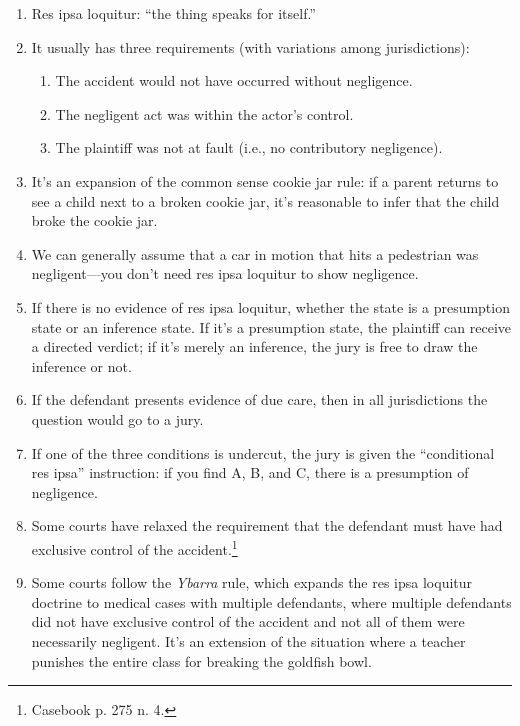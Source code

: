 \begin{enumerate}
    \item Res ipsa loquitur: ``the thing speaks for itself.''
    \item It usually has three requirements (with variations among 
    jurisdictions):
    \begin{enumerate}
        \item The accident would not have occurred without negligence.
        \item The negligent act was within the actor's control.
        \item The plaintiff was not at fault (i.e., no contributory 
        negligence).
    \end{enumerate}
    \item It's an expansion of the common sense cookie jar rule: if a parent 
    returns to see a child next to a broken cookie jar, it's reasonable to 
    infer that the child broke the cookie jar.
    \item We can generally assume that a car in motion that hits a pedestrian 
    was negligent---you don't need res ipsa loquitur to show negligence.
    \item If there is no evidence of res ipsa loquitur, whether the state is a 
    presumption state or an inference state. If it's a presumption state, the 
    plaintiff can receive a directed verdict; if it's merely an inference, the 
    jury is free to draw the inference or not.
    \item If the defendant presents evidence of due care, then in all 
    jurisdictions the question would go to a jury.
    \item If one of the three conditions is undercut, the jury is given the 
    ``conditional res ipsa'' instruction: if you find A, B, and C, there is a 
    presumption of negligence.
    \item Some courts have relaxed the requirement that the defendant must 
    have had exclusive control of the accident.\footnote{Casebook p. 275 n. 
    4.}
    \item Some courts follow the \emph{Ybarra} rule, which expands the res 
    ipsa loquitur doctrine to medical cases with multiple defendants, where 
    multiple defendants did not have exclusive control of the accident and not 
    all of them were necessarily negligent. It's an extension of the situation 
    where a teacher punishes the entire class for breaking the goldfish bowl.
\end{enumerate}

